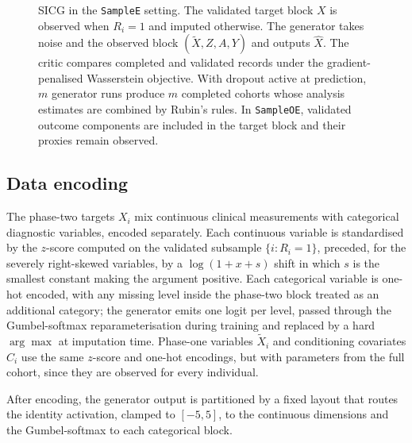 \begin{figure}
{%
}
\caption{SICG in the \texttt{SampleE} setting. The validated target block $X$ is observed when $R_i=1$ and imputed otherwise. The generator takes noise and the observed block $(\tilde X,Z,A,Y)$ and outputs $\hat X$. The critic compares completed and validated records under the gradient-penalised Wasserstein objective. With dropout active at prediction, $m$ generator runs produce $m$ completed cohorts whose analysis estimates are combined by Rubin's rules. In \texttt{SampleOE}, validated outcome components are included in the target block and their proxies remain observed.}
\label{fig:sicg-architecture}
\end{figure}


\subsection{Data encoding}
\label{sec:sicg_encoding}

The phase-two targets $X_i$ mix continuous clinical measurements with categorical diagnostic variables, encoded separately. Each continuous variable is standardised by the $z$-score computed on the validated subsample $\{i : R_i = 1\}$, preceded, for the severely right-skewed variables, by a $\log(1 + x + s)$ shift in which $s$ is the smallest constant making the argument positive. Each categorical variable is one-hot encoded, with any missing level inside the phase-two block treated as an additional category; the generator emits one logit per level, passed through the Gumbel-softmax reparameterisation \citep{jang2017categorical} during training and replaced by a hard $\arg\max$ at imputation time. Phase-one variables $\tilde{X}_i$ and conditioning covariates $C_i$ use the same $z$-score and one-hot encodings, but with parameters from the full cohort, since they are observed for every individual.

After encoding, the generator output is partitioned by a fixed layout that routes the identity activation, clamped to $[-5, 5]$, to the continuous dimensions and the Gumbel-softmax to each categorical block.


